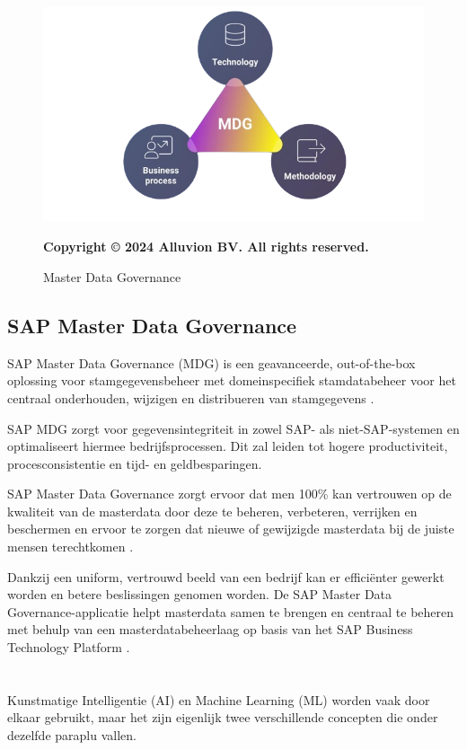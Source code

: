 \begin{figure}[htbp]
  \centering
  \includegraphics[scale=0.5]{../images/AlluvionMDG.png}
  \caption{Master Data Governance}
  \small\textbf{Copyright © 2024 Alluvion BV. All rights reserved.}
\end{figure}

\subsection{SAP Master Data Governance}
SAP Master Data Governance (MDG) is een geavanceerde, out-of-the-box oplossing voor stamgegevensbeheer met domeinspecifiek stamdatabeheer voor het centraal onderhouden, wijzigen en distribueren van stamgegevens \autocite{Avelon}. 

SAP MDG zorgt voor gegevensintegriteit in zowel SAP- als niet-SAP-systemen en optimaliseert hiermee bedrijfsprocessen. Dit zal leiden tot hogere productiviteit, procesconsistentie en tijd- en geldbesparingen.

SAP Master Data Governance zorgt ervoor dat men 100\% kan vertrouwen op de kwaliteit van de masterdata door deze te beheren, verbeteren, verrijken en beschermen en ervoor te zorgen dat nieuwe of gewijzigde masterdata bij de juiste mensen terechtkomen \autocite{Alluvion}.

Dankzij een uniform, vertrouwd beeld van een bedrijf kan er efficiënter gewerkt worden en betere beslissingen genomen worden. De SAP Master Data Governance-applicatie helpt masterdata samen te brengen en centraal te beheren met behulp van een masterdatabeheerlaag op basis van het SAP Business Technology Platform \autocite{SAPMDG}.

\section{}%
\label{sec:ai}
Kunstmatige Intelligentie (AI) en Machine Learning (ML) worden vaak door elkaar gebruikt, maar het zijn eigenlijk twee verschillende concepten die onder dezelfde paraplu vallen.

